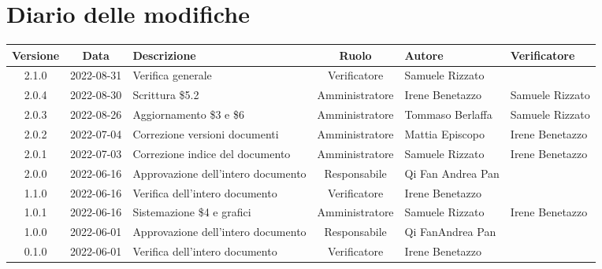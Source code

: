 \section*{Diario delle modifiche}
	\begin{center}
	\renewcommand{\arraystretch}{1.8} %
	\begin{longtable}{ |c|c|p{8em}|c|m{5em}|m{6em}| }
		\hline
		\textbf{Versione} & \textbf{Data} & \textbf{Descrizione} &  \textbf{Ruolo} &  \textbf{Autore} & \textbf{Verificatore} \\
    \hline
		2.1.0 & 2022-08-31 & Verifica generale & Verificatore & Samuele \newline Rizzato & \\
		\hline
		2.0.4 & 2022-08-30 & Scrittura \$5.2 & Amministratore & Irene \newline Benetazzo & Samuele \newline Rizzato\\
		\hline
		2.0.3 & 2022-08-26 & Aggiornamento \$3 e \$6 & Amministratore & Tommaso Berlaffa & Samuele \newline Rizzato\\
		\hline
		2.0.2 & 2022-07-04 & Correzione versioni documenti & Amministratore & Mattia \newline Episcopo & Irene \newline Benetazzo\\
		\hline
		2.0.1 & 2022-07-03 & Correzione indice del documento & Amministratore & Samuele \newline Rizzato & Irene \newline Benetazzo\\
		\hline
		2.0.0 & 2022-06-16 & Approvazione dell'intero documento & Responsabile & Qi Fan \newline Andrea Pan & \\
		\hline
		1.1.0 & 2022-06-16 & Verifica dell'intero documento & Verificatore & Irene \newline Benetazzo & \\
		\hline
		1.0.1 & 2022-06-16 & Sistemazione \$4 e grafici & Amministratore & Samuele \newline Rizzato & Irene \newline Benetazzo \\
		\hline
		1.0.0 & 2022-06-01 & Approvazione dell'intero documento & Responsabile &Qi Fan\newline Andrea Pan & \\
		\hline
		0.1.0 & 2022-06-01 & Verifica dell'intero documento & Verificatore &Irene \newline Benetazzo & \\

\end{longtable}
\end{center}
